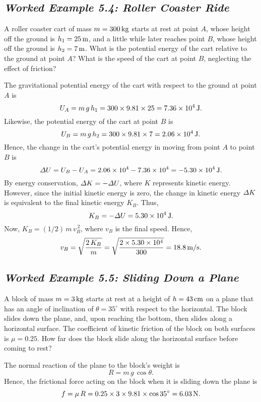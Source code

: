 \subsection*{\em Worked Example 5.4: Roller Coaster Ride}
 A roller coaster cart of mass $m= 300\,{\rm kg}$ starts
at rest at point $A$, whose height off the ground is $h_1=25\,{\rm m}$, and a
little while later reaches point $B$, whose height off the ground is $h_2=7\,{\rm m}$.
What is the potential energy of the cart relative to the ground at point $A$?
What is the speed of the cart at point $B$, neglecting the effect of friction?
\begin{figure*}[h]
\epsfysize=2in
\centerline{}
\end{figure*}

 The gravitational potential energy of the cart with
respect to the ground at point $A$ is
$$
U_A = m\,g\,h_1 = 300\times 9.81 \times 25 = 7.36\times 10^4\,{\rm J}.
$$
Likewise, the potential energy of the cart at point $B$ is
$$
U_B = m\,g\,h_2 = 300\times 9.81 \times 7 = 2.06\times 10^4\,{\rm J}.
$$
Hence, the change in the cart's potential energy in moving from point
$A$ to point $B$ is
$$
{\mit\Delta} U = U_B-U_A = 2.06\times 10^4-7.36\times 10^4 = -5.30\times 10^4\,{\rm J}.
$$
By energy conservation, ${\mit\Delta}K = -{\mit\Delta} U$, where $K$ represents kinetic
energy. However, since the initial kinetic energy is zero, the change in kinetic energy
${\mit\Delta} K$ is equivalent to the final kinetic energy $K_B$. Thus,
$$
K_B = -{\mit\Delta}U = 5.30\times 10^4\,{\rm J}.
$$
Now, $K_B = (1/2)\,m\,v_B^{\,2}$, where $v_B$ is the final speed. Hence,
$$
v_B = \sqrt{\frac{2\,K_B}{m}} = \sqrt{\frac{2\times 5.30\times 10^4}{300}} = 18.8\,{\rm m/s}.
$$

\subsection*{\em Worked Example 5.5: Sliding Down a Plane}
 A block of mass $m=3\,{\rm kg}$ starts at rest at a height of
$h=43\,{\rm cm}$ on a plane that has an angle of inclination of $\theta=35^\circ$ with
respect to the horizontal. The block slides down the
plane, and, upon reaching the bottom, then slides along a horizontal
surface. The coefficient of kinetic friction of the block on both surfaces is $\mu=0.25$. 
How far does the block slide along the horizontal surface before coming to rest?

The normal reaction of the plane to the block's weight is
$$
R = m\,g\,\cos\theta.
$$
Hence, the frictional force acting on the block when it is sliding down the plane
is 
$$
f = \mu\,R = 0.25\times 3\times 9.81 \times \cos 35^\circ = 6.03\,{\rm N}.
$$

